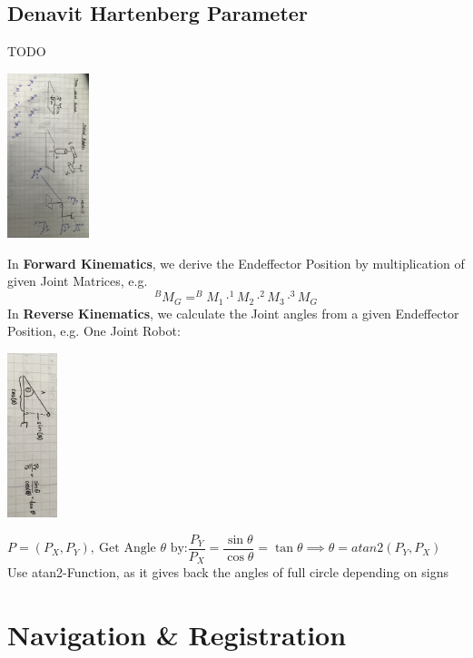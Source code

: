 \documentclass{exerciseBlue}
\begin{document}
\subsection{Denavit Hartenberg Parameter}
TODO
\\
\begin{center}
	\includegraphics[height = 4.8cm]{Images/Kinematics}
\end{center}
\newpage
In \textbf{Forward Kinematics}, we derive the Endeffector Position by multiplication of given Joint Matrices, e.g.\\
$$^BM_G = ^BM_1 \cdot  ^1M_2 \cdot  ^2M_3 \cdot  ^3M_G$$
In \textbf{Reverse Kinematics}, we calculate the Joint angles from a given Endeffector Position, e.g. One Joint Robot:\\
\begin{center}
	\includegraphics[height = 4.8cm]{Images/Angles}
\end{center}
$P = (P_X, P_Y), \ \text{Get Angle } \theta \text{ by:} \dfrac{P_Y}{P_X} = \dfrac{\sin \theta}{\cos \theta} = \tan \theta \implies \theta = atan2(P_Y, P_X)$\\
Use atan2-Function, as it gives back the angles of full circle depending on signs
 
  \section{Navigation \& Registration}
\end{document}
